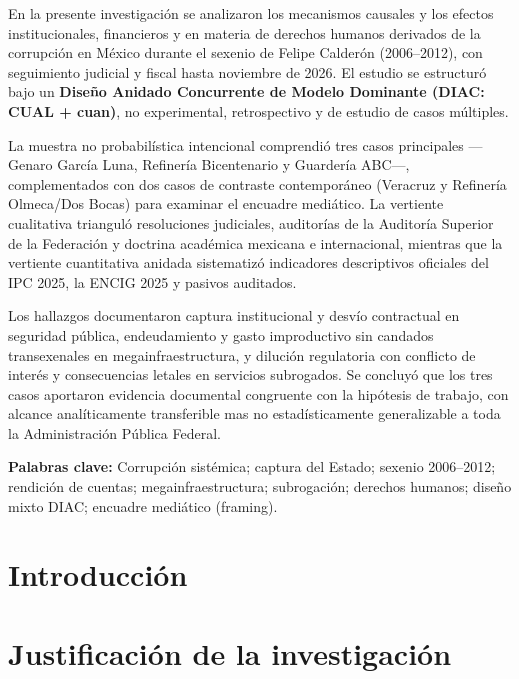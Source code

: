\documentclass[12pt,letterpaper,oneside,openany]{book}
\begin{document}
En la presente investigación se analizaron los mecanismos causales y los efectos 
institucionales, financieros y en materia de derechos humanos derivados de la 
corrupción en México durante el sexenio de Felipe Calderón (2006–2012), con 
seguimiento judicial y fiscal hasta noviembre de 2026. El estudio se estructuró 
bajo un \textbf{Diseño Anidado Concurrente de Modelo Dominante (DIAC: CUAL + cuan)}, 
no experimental, retrospectivo y de estudio de casos múltiples.

La muestra no probabilística intencional comprendió tres casos principales 
---Genaro García Luna, Refinería Bicentenario y Guardería ABC---, complementados 
con dos casos de contraste contemporáneo (Veracruz y Refinería Olmeca/Dos Bocas) 
para examinar el encuadre mediático. La vertiente cualitativa trianguló resoluciones 
judiciales, auditorías de la Auditoría Superior de la Federación y doctrina académica 
mexicana e internacional, mientras que la vertiente cuantitativa anidada sistematizó 
indicadores descriptivos oficiales del IPC 2025, la ENCIG 2025 y pasivos auditados.

Los hallazgos documentaron captura institucional y desvío contractual en seguridad 
pública, endeudamiento y gasto improductivo sin candados transexenales en 
megainfraestructura, y dilución regulatoria con conflicto de interés y consecuencias 
letales en servicios subrogados. Se concluyó que los tres casos aportaron evidencia 
documental congruente con la hipótesis de trabajo, con alcance analíticamente 
transferible mas no estadísticamente generalizable a toda la Administración Pública Federal.

\vspace{1cm}

{\sffamily\bfseries Palabras clave:} Corrupción sistémica; captura del Estado; 
sexenio 2006–2012; rendición de cuentas; megainfraestructura; subrogación; 
derechos humanos; diseño mixto DIAC; encuadre mediático (framing).

\clearpage

\chapter{Introducción}



\clearpage

\chapter{Justificación de la investigación}
\end{document}
